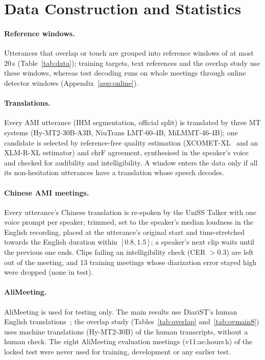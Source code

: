 
\section{Data Construction and Statistics}
\label{app:data}



\paragraph{Reference windows.} Utterances that overlap or touch are grouped into reference windows of at most 20\,s
(Table~\ref{tab:data}); training targets, text references and the overlap study use these windows, whereas test
decoding runs on whole meetings through online detector windows (Appendix~\ref{app:online}).

\paragraph{Translations.} Every AMI utterance (IHM segmentation, official split) is translated by three MT systems
(Hy-MT2-30B-A3B, NiuTrans LMT-60-4B, MiLMMT-46-4B); one candidate is selected by reference-free quality estimation
(XCOMET-XL~\citep{guerreiro2024xcomet} and an XLM-R-XL estimator) and chrF agreement, synthesised in the speaker's
voice and checked for audibility and intelligibility. A window enters the data only if all its non-hesitation
utterances have a translation whose speech decodes.

\paragraph{Chinese AMI meetings.}\label{app:zhdata} Every utterance's Chinese translation is re-spoken by the UniSS
Talker with one voice prompt per speaker, trimmed, set to the speaker's median loudness in the English recording,
placed at the utterance's original start and time-stretched towards the English duration within $[0.8,1.5]$; a
speaker's next clip waits until the previous one ends. Clips failing an intelligibility check (CER $>0.3$) are left out
of the meeting, and 13 training meetings whose diarization error stayed high were dropped (none in test).

\paragraph{AliMeeting.} AliMeeting is used for testing only. The main results use DiariST's human English
translations~\citep{yang2024diarist}; the overlap study (Tables~\ref{tab:overlap} and~\ref{tab:ovmain8}) uses machine
translations (Hy-MT2-30B) of the human transcripts, without a human check. The eight AliMeeting evaluation meetings
(\num{v11:ae:hours}\,h) of the locked test were never used for training, development or any earlier test.

